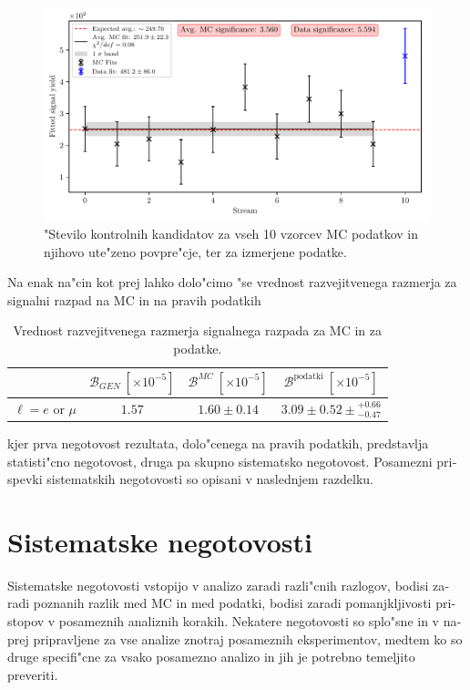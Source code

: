 \begin{otherlanguage}{slovene}
\begin{figure}[H]
	\centering
	\captionsetup{width=0.8\linewidth}
	\includegraphics[width=\linewidth]{fig/sig_global}
	\caption{"Stevilo kontrolnih kandidatov za vseh 10 vzorcev MC podatkov in njihovo ute"zeno povpre"cje, ter za izmerjene podatke.}
	\label{fig:sig_global_si}
\end{figure}

Na enak na"cin kot prej lahko dolo"cimo "se vrednost razvejitvenega razmerja za signalni razpad na MC in na pravih podatkih

\begin{table}[H]
	\centering
	\begin{tabular}{l|c|c|c}
		& $\mathcal{B}_{GEN}~[\times 10^{-5}]$ & $\mathcal{B}^{MC}~[\times 10^{-5}]$ & $\mathcal{B}^{\mathrm{podatki}}~[\times 10^{-5}]$ \\
		\toprule
		$\ell = e$ or $\mu$ & $1.57$ & $1.60 \pm 0.14$ & $3.09 \pm 0.52 \pm {}^{+0.66}_{-0.47}$\\
		\bottomrule
	\end{tabular}
	\captionsetup{width=.8\linewidth}
	\caption{Vrednost razvejitvenega razmerja signalnega razpada za MC in za podatke.}
\label{tab:br_result_sig_si}
\end{table}

kjer prva negotovost rezultata, dolo"cenega na pravih podatkih, predstavlja statisti"cno negotovost, druga pa skupno sistematsko negotovost. Posamezni prispevki sistematskih negotovosti so opisani v naslednjem razdelku.

\section{Sistematske negotovosti}

Sistematske negotovosti vstopijo v analizo zaradi razli"cnih razlogov, bodisi zaradi poznanih razlik med MC in med podatki, bodisi zaradi pomanjkljivosti pristopov v posameznih analiznih korakih. Nekatere negotovosti so splo"sne in v naprej pripravljene za vse analize znotraj posameznih eksperimentov, medtem ko so druge specifi"cne za vsako posamezno analizo in jih je potrebno temeljito preveriti. 


\end{otherlanguage}
